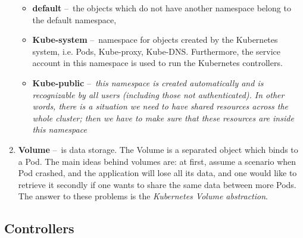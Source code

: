 \begin{enumerate}[itemsep=1mm, parsep=0pt]
    \begin{itemize}
        \item \textbf{default} \---\ the objects which do not have another namespace belong to the default namespace,
        \item \textbf{Kube-system} \---\ namespace for objects created by the Kubernetes system, i.e. Pods, Kube-proxy, Kube-DNS. Furthermore, the service account in this namespace is used to run the Kubernetes controllers.
        \item \textbf{Kube-public} \---\ \textit{this namespace is created automatically and is recognizable by all users (including those not authenticated). In other words, there is a situation we need to have shared resources across the whole cluster; then we have to make sure that these resources are inside this namespace} \cite{namespaceTypes}
    \end{itemize}

    \item \textbf{Volume} \---\ is data storage.
    The Volume is a separated object which binds to a Pod.
    The main ideas behind volumes are: at first, assume a scenario when Pod crashed, and the application will lose all its data, and one would like to retrieve it secondly if one wants to share the same data between more Pods.
    The answer to these problems is the \emph{Kubernetes Volume abstraction}.
\end{enumerate}

\subsection{Controllers}

